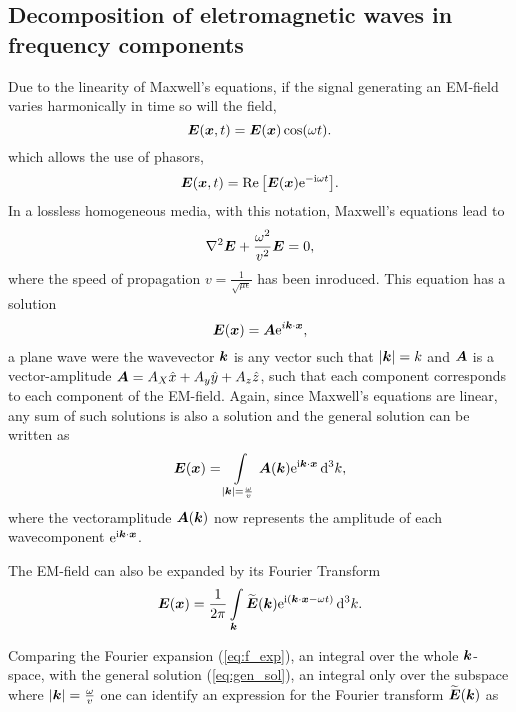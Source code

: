 \documentclass[11pt,a4paper, 
english, swedish %
]{article}
\begin{document}
\subsection{Decomposition of eletromagnetic waves in frequency components}

Due to the linearity of Maxwell's equations, if the signal generating an EM-field varies harmonically in time so will the field,
\begin{equation*}
\vb*E(\vb*x,t)=\vb*E(\vb*x)\cos(\omega t).
\end{equation*}
which allows the use of phasors,
\begin{equation*}
\vb*E(\vb*x,t)=\Re\qty[\vb*E(\vb*x)\mathrm{e}^{-\mathrm{i}\omega t}].
\end{equation*}
In a lossless homogeneous media, with this notation, Maxwell's equations lead to
\begin{equation}
  \label{eq:wave_free}
  \laplacian  \vb*E + \frac{\omega^2}{v^2}\vb*E=0,
\end{equation} 
where the speed of propagation $v=\frac{1}{\sqrt{\mu \epsilon}}$ has been inroduced. This equation has a solution
\begin{equation*}
\vb*E(\vb*x)=\vb*A\mathrm{e}^{i\vb*k \cdot \vb*x},
\end{equation*}
a plane wave were the wavevector $\vb*k$ is any vector such that $\abs{\vb*k}=k$ and $\vb*A$ is a vector-amplitude $\vb*A=A_X\hat{x}+A_y\hat{y}+A_z\hat{z}$, such that each component corresponds to each component of the  EM-field.
Again, since Maxwell's equations are linear, any sum of such solutions is also a solution and the general solution can be written as
\begin{equation}
  \label{eq:gen_sol}
  \vb*E(\vb*x)=\int_{\abs{\vb*k}=\frac{\omega}{v}}\vb*A(\vb*k)\ee^{\ii\vb*k\cdot\vb*x}\id^3k,
\end{equation}
where the vectoramplitude $\vb*A(\vb*k)$ now represents the amplitude of each wavecomponent $\mathrm{e}^{\mathrm{i}\vb*k \cdot \vb*x}$.

The EM-field can also be expanded by its Fourier Transform
\begin{equation}
  \label{eq:f_exp}
  \vb*E(\vb*x)=\frac{1}{2\pi}\int_{\vb*k} \widetilde{\vb*E}(\vb*k) \ee^{\ii(\vb*k\cdot\vb*x - \omega t)}\id^3k.
 \end{equation}


Comparing the Fourier expansion (\ref{eq:f_exp}), an integral over the whole $\vb*k$-space, with the general solution (\ref{eq:gen_sol}), an integral only over the subspace where $\abs{\vb*k}=\frac{\omega}{v}$ one can identify an expression for the Fourier transform $\widetilde{\vb*E}(\vb*k)$ as
\end{document}
